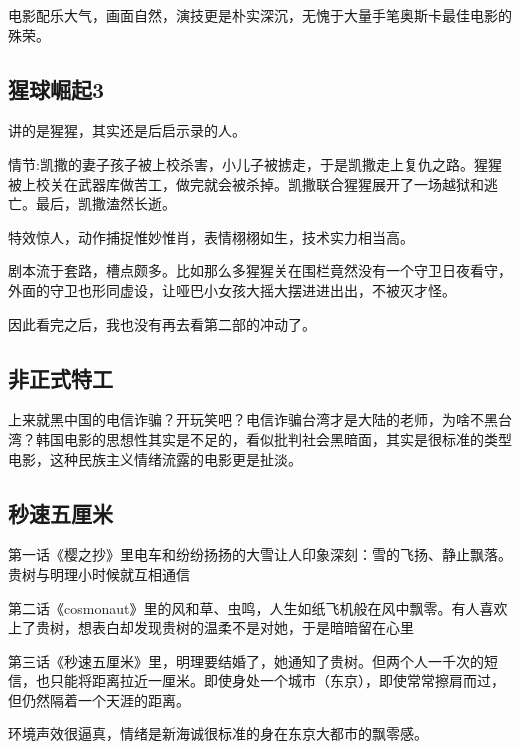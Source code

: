 电影配乐大气，画面自然，演技更是朴实深沉，无愧于大量手笔奥斯卡最佳电影的殊荣。

\subsection{猩球崛起3}

讲的是猩猩，其实还是后启示录的人。

情节:凯撒的妻子孩子被上校杀害，小儿子被掳走，于是凯撒走上复仇之路。猩猩被上校关在武器库做苦工，做完就会被杀掉。凯撒联合猩猩展开了一场越狱和逃亡。最后，凯撒溘然长逝。

特效惊人，动作捕捉惟妙惟肖，表情栩栩如生，技术实力相当高。

剧本流于套路，槽点颇多。比如那么多猩猩关在围栏竟然没有一个守卫日夜看守，外面的守卫也形同虚设，让哑巴小女孩大摇大摆进进出出，不被灭才怪。

因此看完之后，我也没有再去看第二部的冲动了。

\subsection{非正式特工}

上来就黑中国的电信诈骗？开玩笑吧？电信诈骗台湾才是大陆的老师，为啥不黑台湾？韩国电影的思想性其实是不足的，看似批判社会黑暗面，其实是很标准的类型电影，这种民族主义情绪流露的电影更是扯淡。

\subsection{秒速五厘米}

第一话《樱之抄》里电车和纷纷扬扬的大雪让人印象深刻：雪的飞扬、静止飘落。贵树与明理小时候就互相通信

第二话《cosmonaut》里的风和草、虫鸣，人生如纸飞机般在风中飘零。有人喜欢上了贵树，想表白却发现贵树的温柔不是对她，于是暗暗留在心里

第三话《秒速五厘米》里，明理要结婚了，她通知了贵树。但两个人一千次的短信，也只能将距离拉近一厘米。即使身处一个城市（东京），即使常常擦肩而过，但仍然隔着一个天涯的距离。

环境声效很逼真，情绪是新海诚很标准的身在东京大都市的飘零感。
